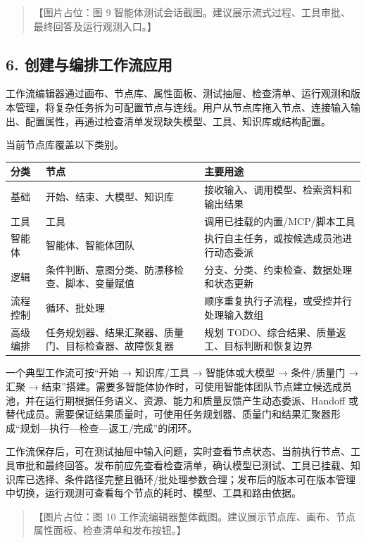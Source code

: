 \documentclass[UTF8,a4paper,12pt]{ctexart}
\begin{document}
\begin{quote}
【图片占位：图 9 智能体测试会话截图。建议展示流式过程、工具审批、最终回答及运行观测入口。】
\end{quote}

\subsection{6. 创建与编排工作流应用}

工作流编辑器通过画布、节点库、属性面板、测试抽屉、检查清单、运行观测和版本管理，将复杂任务拆为可配置节点与连线。用户从节点库拖入节点、连接输入输出、配置属性，再通过检查清单发现缺失模型、工具、知识库或结构配置。

当前节点库覆盖以下类别。

\begin{longtable}[]{@{}lll@{}}
\toprule
分类 & 节点 & 主要用途 \\
\midrule
\endhead
基础 & 开始、结束、大模型、知识库 & 接收输入、调用模型、检索资料和输出结果 \\
工具 & 工具 & 调用已挂载的内置/MCP/脚本工具 \\
智能体 & 智能体、智能体团队 & 执行自主任务，或按候选成员池进行动态委派 \\
逻辑 & 条件判断、意图分类、防漂移检查、脚本、变量赋值 & 分支、分类、约束检查、数据处理和状态更新 \\
流程控制 & 循环、批处理 & 顺序重复执行子流程，或受控并行处理输入数组 \\
高级编排 & 任务规划器、结果汇聚器、质量门、目标检查器、故障恢复器 & 规划 TODO、综合结果、质量返工、目标判断和恢复边界 \\
\bottomrule
\end{longtable}

一个典型工作流可按``开始 → 知识库/工具 → 智能体或大模型 → 条件/质量门 → 汇聚 → 结束''搭建。需要多智能体协作时，可使用智能体团队节点建立候选成员池，并在运行期根据任务语义、资源、能力和质量反馈产生动态委派、Handoff 或替代成员。需要保证结果质量时，可使用任务规划器、质量门和结果汇聚器形成``规划—执行—检查—返工/完成''的闭环。

工作流保存后，可在测试抽屉中输入问题，实时查看节点状态、当前执行节点、工具审批和最终回答。发布前应先查看检查清单，确认模型已测试、工具已挂载、知识库已选择、条件路径完整且循环/批处理参数合理；发布后的版本可在版本管理中切换，运行观测可查看每个节点的耗时、模型、工具和路由依据。

\begin{quote}
【图片占位：图 10 工作流编辑器整体截图。建议展示节点库、画布、节点属性面板、检查清单和发布按钮。】
\end{quote}
\end{document}
